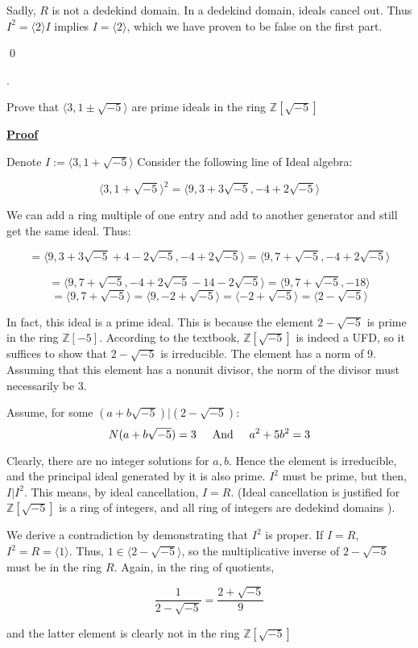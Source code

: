 \documentclass{article}
\def\ZZ{{\mathbb{Z}}}
\def\contradiction{{\lightning}}
\newcounter{problemcnt}
\newcommand{\Problem}{{
    \vspace{5mm}
    \stepcounter{problemcnt}
    \noindent
    \arabic{problemcnt}. 
}
}
\newcommand{\Proof}{{
    \vspace{2mm}
    \noindent
    \textbf{
    \underline{Proof}}
}
}
\newcommand{\textAnd}{
    \hspace{5mm}
    \textrm{And}
    \hspace{5mm}
}
\newcommand{\<}{{
    \langle
}}
\def\>{{
    \rangle
}}
\def\ZZ{{\mathbb{Z}}}
\begin{document}
Sadly, $R$ is not a dedekind domain. In a dedekind domain, 
ideals cancel out. Thus $I^2 = \<2\>I$ implies $I = \<2\>$, 
which we have proven to be false on the first part. 
\contradiction

\qed

\newpage

\Problem
Prove that $\<3, 1\pm \sqrt{-5}\>$ are prime ideals in the ring 
$\ZZ[\sqrt{-5}]$

\Proof
Denote $I:=\<3, 1+ \sqrt{-5}\>$
Consider the following line of Ideal algebra:

\[
    \<3, 1+\sqrt{-5}\>^2 = \<9, 3+3\sqrt{-5}, -4+2\sqrt{-5}\>
\]

We can add a ring multiple of one entry and add to another generator 
and still get the same ideal. Thus:

\[
    = \<9, 3+3\sqrt{-5} +4 - 2\sqrt{-5}, -4+2\sqrt{-5}\> 
    = \<9, 7+\sqrt{-5}, -4+2\sqrt{-5}\> 
\]

\[
    = \<9, 7+\sqrt{-5}, -4+2\sqrt{-5}-14-2\sqrt{-5}\>
    = \<9, 7+\sqrt{-5}, -18\> 
\]
\[
    = \<9, 7+\sqrt{-5}\> = \<9, -2+\sqrt{-5}\>
    = \<-2+\sqrt{-5}\> = \<2-\sqrt{-5}\>
\]

In fact, this ideal is a prime ideal. This is because the element 
$2-\sqrt{-5}$ is prime in the ring $\ZZ[-5]$. According to the textbook, 
$\ZZ[\sqrt{-5}]$ is indeed a UFD, so it suffices to show that 
$2-\sqrt{-5}$ is irreducible. The element has a norm of 9. 
Assuming that this element has a nonunit divisor, the norm of 
the divisor must necessarily be 3. 

Assume, for some $(a+b\sqrt{-5}) | (2-\sqrt{-5})$:
\[
    N(a+b\sqrt{-5}) = 3 \textAnd a^2+5b^2 = 3
\]

Clearly, there are no integer solutions for $a, b$. 
Hence the element is irreducible, and the principal ideal 
generated by it is also prime. $I^2$ must be prime, but then, 
$I|I^2$. This means, by ideal cancellation, $I = R$. 
(Ideal cancellation is justified for $\ZZ[\sqrt{-5}]$ is a ring 
of integers, and all ring of integers are dedekind domains
). 

We derive a contradiction by demonstrating that 
$I^2$ is proper. If $I = R$, $I^2 = R = \<1\>$. Thus, 
$1 \in \<2-\sqrt{-5}\>$, so the multiplicative 
inverse of $2-\sqrt{-5}$ must be in the ring $R$. 
Again, in the ring of quotients, 

\[
    \frac{1}{2-\sqrt{-5}} = \frac{2+\sqrt{-5}}{9}
\]

and the latter element is clearly not in the ring 
$\ZZ[\sqrt{-5}]$ \contradiction 
\end{document}
